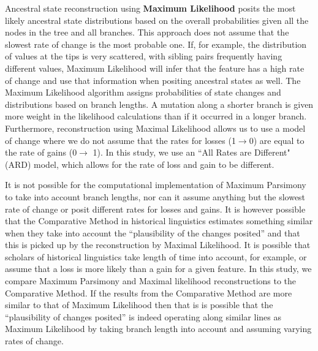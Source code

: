 \documentclass[draft,10pt]{article} %
\begin{document}
Ancestral state reconstruction using \textbf{Maximum Likelihood} posits the most likely ancestral state distributions based on the overall probabilities given all the nodes in the tree and all branches. This approach does not assume that the slowest rate of change is the most probable one. If, for example, the distribution of values at the tips is very scattered, with sibling pairs frequently having different values, Maximum Likelihood will infer that the feature has a high rate of change and use that information when positing ancestral states as well. The Maximum Likelihood algorithm assigns probabilities of state changes and distributions based on branch lengths. A mutation along a shorter branch is given more weight in the likelihood calculations than if it occurred in a longer branch. Furthermore, reconstruction using Maximal Likelihood allows us to use a model of change where we do not assume that the rates for losses (1$\rightarrow$0) are equal to the rate of gains (0$\rightarrow$ 1). In this study, we use an ``All Rates are Different" (ARD) model, which allows for the rate of loss and gain to be different. 

It is not possible for the computational implementation of Maximum Parsimony to take into account branch lengths, nor can it assume anything but the slowest rate of change or posit different rates for losses and gains. It is however possible that the Comparative Method in historical linguistics estimates something similar when they take into account the ``plausibility of the changes posited'' and that this is picked up by the reconstruction by Maximal Likelihood. It is possible that scholars of historical linguistics take length of time into account, for example, or assume that a loss is more likely than a gain for a given feature. In this study, we compare Maximum Parsimony and Maximal likelihood reconstructions to the Comparative Method. If the results from the Comparative Method are more similar to that of Maximum Likelihood then that is is possible that the ``plausibility of changes posited'' is indeed operating along similar lines as Maximum Likelihood by taking branch length into account and assuming varying rates of change.

 
\end{document}
